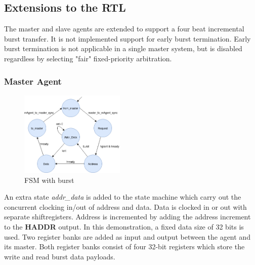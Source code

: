 \subsection{Extensions to the RTL}
The master and slave agents are extended to support a four beat incremental burst transfer. It is not implemented support for early burst termination. Early burst termination is not applicable in a single master system, but is disabled regardless by selecting "fair" fixed-priority arbitration.  
 
\subsubsection{Master Agent}
\begin{figure}
\includegraphics[width=5cm]{figs/hw/mAgent_burstfsm.png}
\caption{FSM with burst}\label{fig:magt-burstfsm}
\end{figure} 

An extra state \textit{addr\_data} is added to the state machine which carry out the concurrent clocking in/out of address and data. Data is clocked in or out with separate shiftregisters. Address is incremented by adding the address increment to the \textbf{HADDR} output. In this demonstration, a fixed data size of 32 bits is used. Two register banks are added as input and output between the agent and its master. Both register banks consist of four 32-bit registers which store the write and read burst data payloads. 

